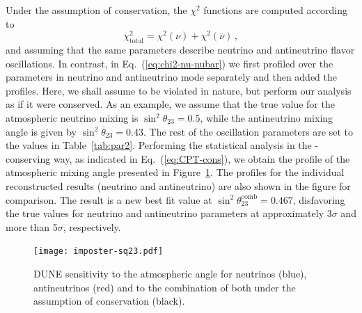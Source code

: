 Under the assumption of  conservation, the $\chi^2$ functions are computed according to
%
\begin{equation}
 \chi^2_{\text{total}}=\chi^2(\nu)+\chi^2(\overline{\nu})\, ,
 \label{eq:CPT-cons}
\end{equation}
%
and assuming that the same parameters describe neutrino and antineutrino flavor oscillations. In contrast, in Eq.~(\ref{eq:chi2-nu-nubar}) we first profiled over the parameters in neutrino and antineutrino mode separately and then added the profiles. Here, we shall assume  to be violated in nature, but perform our analysis as if it were conserved. As an example, we assume that the true value for the atmospheric neutrino mixing is $\sin^2\theta_{23}=0.5$, while the antineutrino mixing angle is given by $\sin^2\overline{\theta}_{23}=0.43$. The rest of the oscillation parameters are set to the values in Table~\ref{tab:par2}. Performing the statistical analysis in the -conserving way, as indicated in Eq.~(\ref{eq:CPT-cons}), we obtain the profile of the atmospheric mixing angle presented in Figure~\ref{fig:imposter-sq23}. The profiles for the individual reconstructed results (neutrino and antineutrino) are also shown in the figure for comparison.
The result is a new best fit value at $\sin^2\theta^\text{comb}_{23}=0.467$, disfavoring the true values for neutrino and antineutrino parameters at approximately 3$\sigma$ and more than 5$\sigma$, respectively. 

\begin{figure}[!htb]
 \centering
        \texttt{[image: imposter-sq23.pdf]}
        \caption[Sensitivity to atmospheric angle for neutrinos, antineutrinos, and combination under  conservation]{DUNE sensitivity to the atmospheric angle for neutrinos (blue), antineutrinos (red) and to the combination of both under the assumption of  conservation (black).
         }
	\label{fig:imposter-sq23}
\end{figure}

